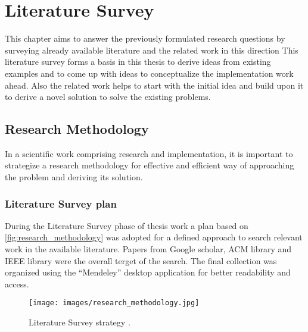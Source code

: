 \chapter{Literature Survey}\label{chapter:LiteratureSurvey}

This chapter aims to answer the previously formulated research questions by surveying already available literature and the related work in this direction This literature survey forms a basis in this thesis to derive ideas from existing examples and to come up with ideas to conceptualize the implementation work ahead. Also the related work helps to start with the initial idea and build upon it to derive a novel solution to solve the existing problems.
\section{Research Methodology}
In a scientific work comprising research and implementation, it is important to strategize a research methodology for effective and efficient way of approaching the problem and deriving its solution.

\subsection{Literature Survey plan}
\indent During the Literature Survey phase of thesis work a plan based on \autoref{fig:research_methodology} \cite{Unterkalmsteiner2011} was adopted for a defined approach to search relevant work in the available literature. Papers from Google scholar, ACM library and IEEE library were the overall terget of the search. The final collection was organized using the \enquote{Mendeley} desktop application for better readability and access. 
\begin{figure}[H]
  \centering
  \texttt{[image: images/research\_methodology.jpg]}
  \caption[Literature Survey strategy  \cite{Unterkalmsteiner2011}]{Literature Survey strategy  \cite{Unterkalmsteiner2011}.}\label{fig:research_methodology}
\end{figure}


